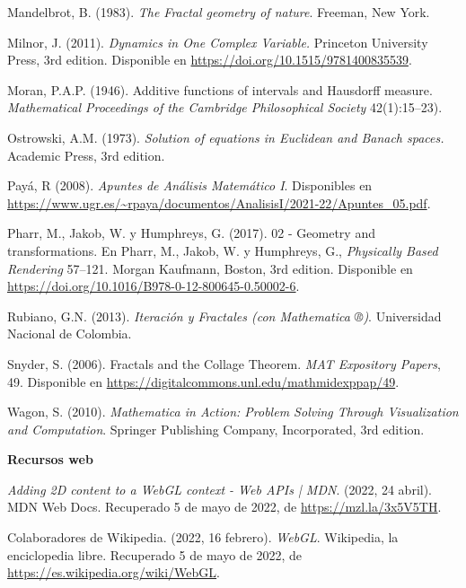 \begin{thebibliography}{99}
     Mandelbrot, B. (1983). \textit{The Fractal geometry of nature}. Freeman, New York.

     Milnor, J. (2011). \textit{Dynamics in One Complex Variable.} Princeton University Press, 3rd edition. Disponible en \url{https://doi.org/10.1515/9781400835539}.

    Moran, P.A.P. (1946). Additive functions of intervals and Hausdorff measure. \textit{Mathematical Proceedings of the Cambridge Philosophical Society} 42(1):15--23).

     Ostrowski, A.M. (1973). \textit{Solution of equations in Euclidean and Banach spaces.} Academic Press, 3rd edition.

     Payá, R (2008). \textit{Apuntes de Análisis Matemático I}. Disponibles en \url{https://www.ugr.es/~rpaya/documentos/AnalisisI/2021-22/Apuntes_05.pdf}.

     Pharr, M., Jakob, W. y Humphreys, G. (2017). 02 - Geometry and transformations. En Pharr, M., Jakob, W. y Humphreys, G., \textit{Physically Based Rendering} 57--121. Morgan Kaufmann, Boston, 3rd edition. Disponible en \url{https://doi.org/10.1016/B978-0-12-800645-0.50002-6}. 

     Rubiano, G.N. (2013). \textit{Iteración y Fractales (con Mathematica ®)}. Universidad Nacional de Colombia.

     Snyder, S. (2006). Fractals and the Collage Theorem. \textit{MAT Expository Papers}, 49. Disponible en \url{https://digitalcommons.unl.edu/mathmidexppap/49}.

    Wagon, S. (2010). \textit{Mathematica in Action: Problem Solving Through Visualization and Computation}. Springer Publishing Company, Incorporated, 3rd edition.

\vspace{1cm}


\textbf{{\Large Recursos web}}

     \textit{Adding 2D content to a WebGL context - Web APIs | MDN}. (2022, 24 abril). MDN Web Docs. Recuperado 5 de mayo de 2022, de \url{https://mzl.la/3x5V5TH}.

     Colaboradores de Wikipedia. (2022, 16 febrero). \textit{WebGL}. Wikipedia, la enciclopedia libre. Recuperado 5 de mayo de 2022, de \url{https://es.wikipedia.org/wiki/WebGL}.


\end{thebibliography}
